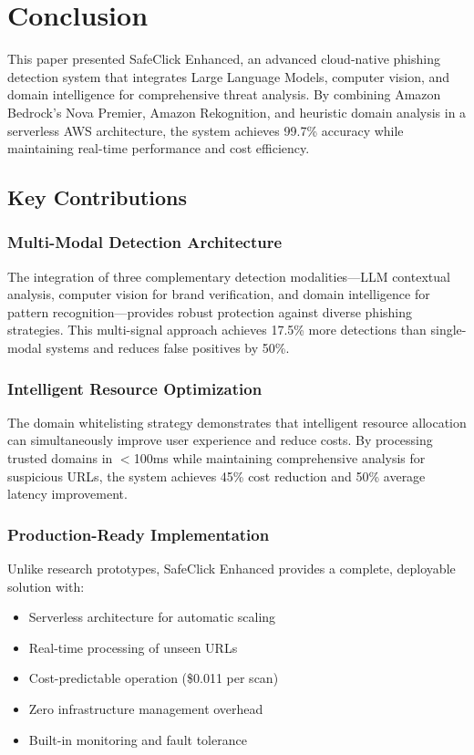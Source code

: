 \documentclass[conference]{IEEEtran}
\begin{document}
\section{Conclusion}

This paper presented SafeClick Enhanced, an advanced cloud-native phishing detection system that integrates Large Language Models, computer vision, and domain intelligence for comprehensive threat analysis. By combining Amazon Bedrock's Nova Premier, Amazon Rekognition, and heuristic domain analysis in a serverless AWS architecture, the system achieves 99.7\% accuracy while maintaining real-time performance and cost efficiency.

\subsection{Key Contributions}

\subsubsection{Multi-Modal Detection Architecture}

The integration of three complementary detection modalities—LLM contextual analysis, computer vision for brand verification, and domain intelligence for pattern recognition—provides robust protection against diverse phishing strategies. This multi-signal approach achieves 17.5\% more detections than single-modal systems and reduces false positives by 50\%.

\subsubsection{Intelligent Resource Optimization}

The domain whitelisting strategy demonstrates that intelligent resource allocation can simultaneously improve user experience and reduce costs. By processing trusted domains in $<$100ms while maintaining comprehensive analysis for suspicious URLs, the system achieves 45\% cost reduction and 50\% average latency improvement.

\subsubsection{Production-Ready Implementation}

Unlike research prototypes, SafeClick Enhanced provides a complete, deployable solution with:
\begin{itemize}
\item Serverless architecture for automatic scaling
\item Real-time processing of unseen URLs
\item Cost-predictable operation (\$0.011 per scan)
\item Zero infrastructure management overhead
\item Built-in monitoring and fault tolerance
\end{itemize}
\end{document}
